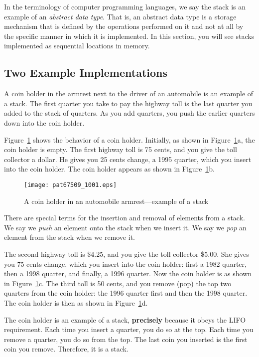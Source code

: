 \documentclass{patt}
\begin{document}
In the terminology of computer programming languages, we say the stack
is an example of an {\em abstract data type}. That is, an abstract
data type is a  storage mechanism that is
defined by the operations performed on it and not at all by the
specific manner in which it is implemented.  In this section, you will 
see stacks implemented as sequential locations in memory.  

\subsection{Two Example Implementations}

A coin holder in the armrest next to the driver of an automobile is an example 
of a stack. The first quarter you take to pay the highway toll is the last
quarter you added to the stack of quarters. As you add quarters, you
push the earlier quarters down into the coin holder.

Figure~\ref{fig:coin.holder} shows the behavior of a coin
holder. Initially, as shown in Figure~\ref{fig:coin.holder}a, the coin
holder is empty. The first highway toll is 75 cents, and you give the
toll collector a dollar. He gives you 25 cents change, a 1995
quarter, which you insert into the coin holder.  The coin holder
appears as shown in Figure~\ref{fig:coin.holder}b.

\begin{figure}[h]
\centerline{\texttt{[image: pat67509\_1001.eps]}}
\caption{A coin holder in an automobile
  armrest$\!$---$\!$example of a stack}
\label{fig:coin.holder}
\end{figure}

There are special terms for the insertion and removal of elements from
a stack. We say we {\em push} an element onto the stack when we insert
it. We say we {\em pop} an element from the stack when we 
 remove it.

The second highway toll is \$4.25, and you give the toll collector
\$5.00. She gives you 75 cents change, which you insert into the coin
holder: first a 1982 quarter, then a 1998 quarter, and finally, a 1996
quarter. Now the coin holder is as shown in
Figure~\ref{fig:coin.holder}c.  The third toll is 50 cents, and you
remove (pop) the top two quarters from the coin holder: the 1996
quarter first and then the 1998 quarter. The coin holder is then as
shown in Figure~\ref{fig:coin.holder}d.

The coin holder is an example of a stack, {\bf precisely} because it
obeys the LIFO requirement. Each time you insert a quarter, you do so
at the top. Each time you remove a quarter, you do so from the top.
The last coin you inserted is the first coin you remove. Therefore, it
is a stack.
\end{document}
